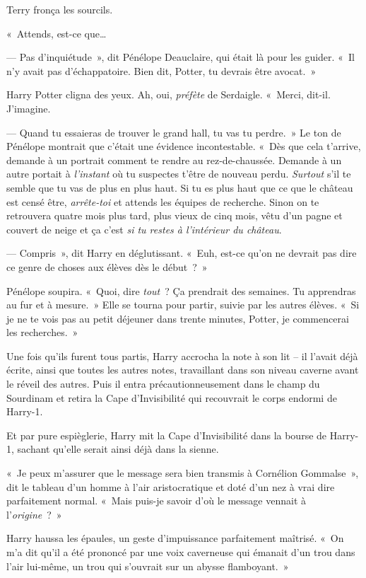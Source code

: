 Terry fronça les sourcils.

«~Attends, est-ce que…

--- Pas d'inquiétude~», dit Pénélope Deauclaire, qui était là pour les guider.
«~Il n'y avait pas d'échappatoire. Bien dit, Potter, tu devrais être avocat.~»

Harry Potter cligna des yeux. Ah, oui, \emph{préfète} de Serdaigle.
«~Merci, dit-il. J'imagine.

--- Quand tu essaieras de trouver le grand hall, tu vas tu perdre.~»
Le ton de Pénélope montrait que c'était une évidence incontestable.
«~Dès que cela t'arrive, demande à un portrait comment te rendre au rez-de-chaussée.
Demande à un autre portait à \emph{l'instant} où tu suspectes t'être de nouveau perdu.
\emph{Surtout} s'il te semble que tu vas de plus en plus haut.
Si tu es plus haut que ce que le château est censé être, \emph{arrête-toi} et attends les équipes de recherche.
Sinon on te retrouvera quatre mois plus tard, plus vieux de cinq mois, vêtu d'un pagne et couvert de neige et ça c'est \emph{si tu restes à l'intérieur du château}.

--- Compris~», dit Harry en déglutissant. «~Euh, est-ce qu'on ne devrait pas dire ce genre de choses aux élèves dès le début~?~»

Pénélope soupira. «~Quoi, dire \emph{tout}~? Ça prendrait des semaines.
Tu apprendras au fur et à mesure.~»
Elle se tourna pour partir, suivie par les autres élèves.
«~Si je ne te vois pas au petit déjeuner dans trente minutes, Potter, je commencerai les recherches.~»

Une fois qu'ils furent tous partis, Harry accrocha la note à son lit -- il l'avait déjà écrite, ainsi que toutes les autres notes, travaillant dans son niveau caverne avant le réveil des autres.
Puis il entra précautionneusement dans le champ du Sourdinam et retira la Cape d'Invisibilité qui recouvrait le corps endormi de Harry-1.

Et par pure espièglerie, Harry mit la Cape d'Invisibilité dans la bourse de Harry-1, sachant qu'elle serait ainsi déjà dans la sienne.

\later

«~Je peux m'assurer que le message sera bien transmis à Cornélion Gommalse~», dit le tableau d'un homme à l'air aristocratique et doté d'un nez à vrai dire parfaitement normal.
«~Mais puis-je savoir d'où le message vennait à l'\emph{origine}~?~»

Harry haussa les épaules, un geste d'impuissance parfaitement maîtrisé.
«~On m'a dit qu'il a été prononcé par une voix caverneuse qui émanait d'un trou dans l'air lui-même, un trou qui s'ouvrait sur un abysse flamboyant.~»

